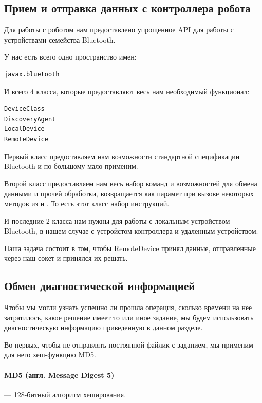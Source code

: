 \subsection{Прием и отправка данных с контроллера робота}

Для работы с роботом нам предоставлено упрощенное API для работы с устройствами семейства Bluetooth.

У нас есть всего одно пространство имен:
\begin{lstlisting}[caption={Пространство для работы с Bluetooth на контроллерах NXT}, label=lst:design3]
javax.bluetooth
\end{lstlisting}

И всего 4 класса, которые предоставляют весь нам необходимый функционал:
\begin{lstlisting}[caption={Классы для работы с Bluetooth на контроллерах NXT}, label=lst:design4]
DeviceClass 
DiscoveryAgent 
LocalDevice 
RemoteDevice
\end{lstlisting}

Первый класс предоставляем нам возможности стандартной спецификации Bluetooth и по большому мало применим.

Второй класс предоставляем нам весь набор команд и возможностей для обмена данными и прочей обработки, возвращается как парамет при вызове некоторых методов из  и . То есть этот класс набор инструкций. 

И последние 2 класса нам нужны для работы с локальным устройством Bluetooth, в нашем случае с устройстом контроллера и удаленным устройством.

Наша задача состоит в том, чтобы RemoteDevice принял данные, отправленные через наш сокет и принялся их решать.

\subsection{Обмен диагностической информацией}

Чтобы мы могли узнать успешно ли прошла операция, сколько времени на нее затратилось, какое решение имеет то или иное задание, мы будем использовать диагностическую информацию приведенную в данном разделе.

Во-первых, чтобы не отправлять постоянной файлик с заданием, мы применим для него хеш-функцию MD5.

\paragraph{MD5 (англ. Message Digest 5)} — 128-битный алгоритм хеширования.

